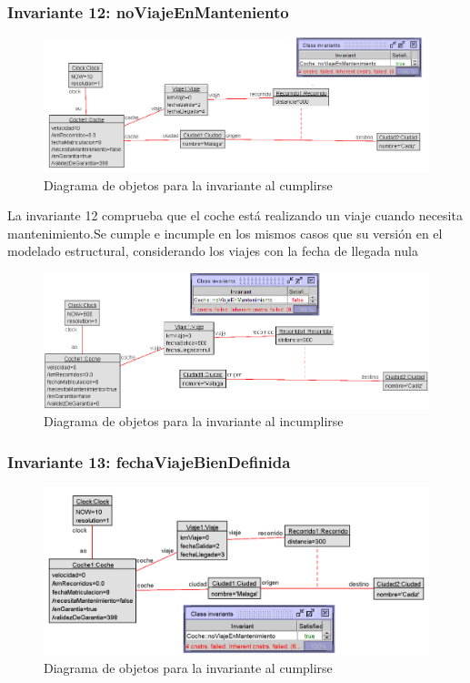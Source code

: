\documentclass[12pt.a4paper]{article}
\begin{document}
\subsubsection{Invariante 12: noViajeEnManteniento}
\vspace{1.0 cm}
\begin{figure}[H]
     \includegraphics[width=0.80\linewidth]{Soils/dinamico_inv12_true.png}
     \caption{Diagrama de objetos para la invariante al cumplirse}
\end{figure}
La invariante 12 comprueba que el coche está realizando un viaje cuando necesita mantenimiento.Se cumple e incumple en los mismos casos que su versión en el modelado estructural, considerando los viajes con la fecha de llegada nula

\begin{figure}[H]
     \includegraphics[width=1\linewidth]{Soils/dinamico_inv12_false.png}
     \caption{Diagrama de objetos para la invariante al incumplirse}
\end{figure}

\subsubsection{Invariante 13: fechaViajeBienDefinida}
\vspace{1.0 cm}
\begin{figure}[H]
     \includegraphics[width=0.80\linewidth]{Soils/dinamico_inv13_true.png}
     \caption{Diagrama de objetos para la invariante al cumplirse}
\end{figure}
\end{document}
